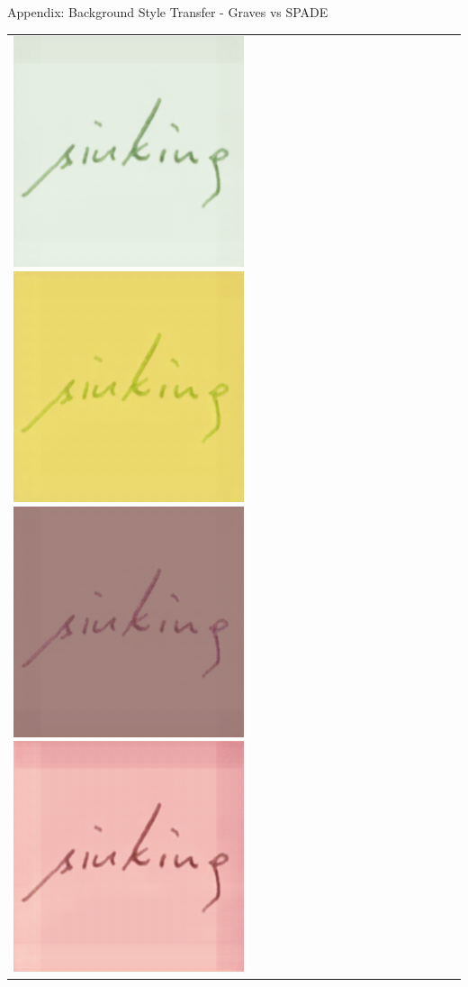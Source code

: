 \documentclass[aspectratio=169]{beamer}
\begin{document}
\begin{frame}{Appendix: Background Style Transfer - Graves vs SPADE}
{\begin{tabular}{lc}
{  \includegraphics[scale=0.18]{../thesis/assets/background_style_transfer/spade/result_pix2pix/46.png}%
  \includegraphics[scale=0.18]{../thesis/assets/background_style_transfer/spade/result_pix2pix/49.png}%
  \includegraphics[scale=0.18]{../thesis/assets/background_style_transfer/spade/result_pix2pix/31.png}%
  \includegraphics[scale=0.18]{../thesis/assets/background_style_transfer/spade/result_pix2pix/74.png}%
}
\end{tabular}}
\end{frame}
\end{document}
